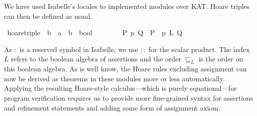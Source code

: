 \documentclass{llncs}
\begin{document}
We have used Isabelle's locales to implemented modules over KAT. Hoare
triples can then be defined as usual.

\begin{isabellebody}
\isanewline
{}\isamarkupfalse%
\ hoare{}triple\ {}{}\ {}{}b\ {}\ {}a\ {}\ {}b\ {}\ bool{}\ {}{}{}{}{}\ {}\ {}{}{}{}\ {}{}{}{}{}{}{}{}{}{}\ {}{}{}\ \isanewline
\ \ {}{}P{}\ p\ {}Q{}\ {}\ P\ {}\ p\ {}\isactrlbsub L\isactrlesub \ Q{}\isanewline
\end{isabellebody}

\noindent As $:$ is a reserved symbol in Isabelle, we use $::$ for the
scalar product. The index $L$ refers to the boolean algebra of
assertions and the order $\sqsubseteq_L$ is the order on this boolean
algebra. As is well know, the Hoare rules excluding assignment can now
be derived as theorems in these modules more or less
automatically. Applying the resulting Hoare-style calculus---which is
purely equational---for program verification requires us to provide
more fine-grained syntax for assertions and refinement statements and
adding some form of assignment axiom.
\end{document}
